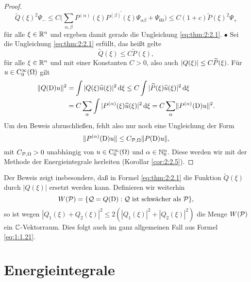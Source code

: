 \begin{proof}
\begin{equation}\label{eq:2.9}
\widetilde{Q}(\xi)^2 \Psi_- \le C  \bigg(\sum_{\alpha,\beta}P^{(\alpha)}(\xi)\overline{{P}^{(\beta)}(\xi)}\Psi_{\alpha\beta}+\Psi_{00}\bigg) \leq  C(1+c) \widetilde{P}(\xi)^2 \Psi_+
\end{equation}
für alle $\xi\in\mathbb R^n$ und ergeben damit gerade die Ungleichung \eqref{eq:thm:2:2.1}.
%
$\bullet$
Sei die Ungleichung \eqref{eq:thm:2:2.1} erfüllt, das heißt gelte
\begin{equation}\label{eq:2.10}
\widetilde{Q}(\xi)\leq C\widetilde{P}(\xi),
\end{equation}
für alle $\xi\in\mathbb R^n$ und mit einer Konstanten $C>0$,
also auch $\lvert Q(\xi)\rvert\leq C\widetilde{P}(\xi)$.
Für $u\in\mathrm C_0^\infty(\Omega)$ gilt
\begin{align}
\|Q(\mathrm D) u\|^2 &= \int |Q(\xi) \widehat{u}(\xi)|^2 \,\mathrm d\xi
\leq C \int |\widetilde P(\xi) \widehat{u}(\xi)|^2 \,\mathrm d\xi \notag\\&  = C\sum_\alpha\int | P^{(\alpha)}(\xi)\widehat{u}(\xi)|^2\,\mathrm d\xi = C\sum_\alpha\lVert P^{(\alpha)}(\mathrm D)u\rVert^2.\label{eq:2.11}
\end{align}
Um den Beweis abzuschließen,
fehlt also nur noch eine Ungleichung der Form
\begin{equation}
\lVert P^{(\alpha)}(\mathrm D)u\rVert\leq C_{\mathcal P,\Omega}\lVert P(\mathrm D)u\rVert, \label{eq:2:wantedineq}
\end{equation}
mit $C_{\mathcal P,\Omega}>0$ unabhängig von $u\in\mathrm C_0^\infty(\Omega)$ und $\alpha\in\mathbb N_0^n$. Diese werden wir mit der Methode der Energieintegrale herleiten (Korollar \ref{cor:2:2.5}).
\end{proof}

\begin{rem}
Der Beweis zeigt insbesondere, daß in Formel \eqref{eq:thm:2:2.1} die Funktion $\widetilde{Q}(\xi)$ durch $|Q(\xi)|$ ersetzt werden kann.
Definieren wir weiterhin
\begin{equation}
W(\mathcal P)=\{\mathcal Q=Q(\mathrm D):\mathcal Q~\text{ist schwächer als}~\mathcal P\},
\end{equation}
so ist wegen $|Q_1(\xi)+Q_2(\xi)|^2\leq2(|Q_1(\xi)|^2+|Q_2(\xi)|^2)$
die Menge $W(\mathcal P)$ ein $\mathbb C$-Vektorraum.
Dies folgt auch im ganz allgemeinen Fall aus Formel \eqref{eq:1:1.21}.
\end{rem}

\section{Energieintegrale}

